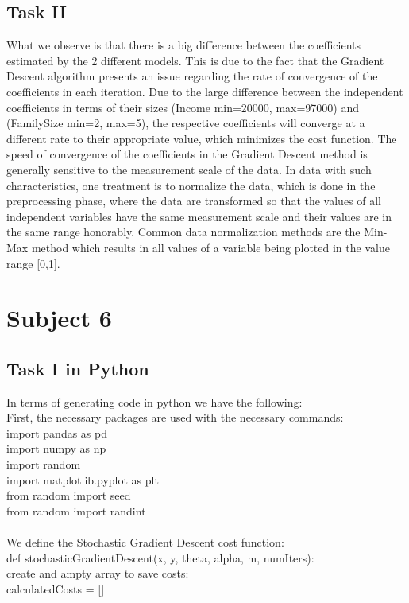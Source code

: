 \documentclass[10pt,a4paper]{article}
\begin{document}
	\subsection{Task II }
What we observe is that there is a big difference between the coefficients estimated by the 2 different models. This is due to the fact that the Gradient Descent algorithm presents an issue regarding the rate of convergence of the coefficients in each iteration. Due to the large difference between the independent coefficients in terms of their sizes (Income min=20000, max=97000) and (FamilySize min=2, max=5), the respective coefficients will converge at a different rate to their appropriate value, which minimizes the cost function. The speed of convergence of the coefficients in the Gradient Descent method is generally sensitive to the measurement scale of the data. In data with such characteristics, one treatment is to normalize the data, which is done in the preprocessing phase, where the data are transformed so that the values of all independent variables have the same measurement scale and their values are in the same range honorably. Common data normalization methods are the Min-Max method which results in all values of a variable being plotted in the value range [0,1].
	
	
\section{Subject 6}
\subsection{Task I in Python}
In terms of generating code in python we have the following:\\
First, the necessary packages are used with the necessary commands:\\
import pandas as pd\\
import numpy as np\\
import random\\
import matplotlib.pyplot as plt\\
from random import seed\\
from random import randint\\
\\

We define the  Stochastic Gradient Descent cost function:\\
def stochasticGradientDescent(x, y, theta, alpha, m, numIters):\\
create and ampty array to save costs:\\
calculatedCosts = []\\
\end{document}
